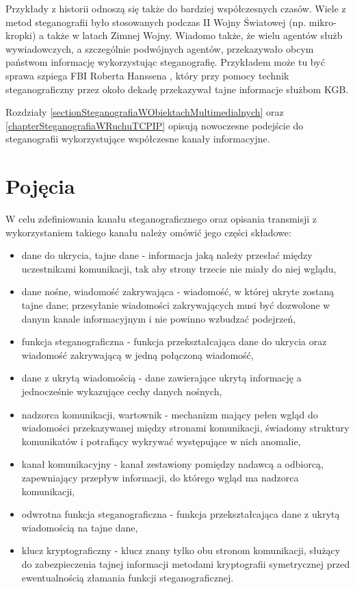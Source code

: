 \documentclass[a4paper,12pt,twoside,openany]{report}
\begin{document}
Przykłady z historii odnoszą się także do bardziej współczesnych czasów. Wiele z 
metod steganografii było stosowanych podczas II Wojny Światowej (np. 
mikro-kropki) a także w latach Zimnej Wojny. Wiadomo także, że wielu agentów 
służb wywiadowczych, a szczególnie podwójnych agentów, przekazywało obcym 
państwom informację wykorzystując steganografię. Przykładem może tu być sprawa 
szpiega FBI Roberta Hanssena \cite{Hanssen}, który przy pomocy technik 
steganograficzny przez około dekadę przekazywał tajne informacje służbom KGB.

Rozdziały \ref{sectionSteganografiaWObiektachMultimedialnych} oraz 
\ref{chapterSteganografiaWRuchuTCPIP} opisują nowoczesne podejście do 
steganografii wykorzystujące współczesne kanały informacyjne. 
\section{Pojęcia}
W celu zdefiniowania kanału steganograficznego oraz opisania transmisji z 
wykorzystaniem takiego kanału należy omówić jego części składowe:
\begin{itemize}
	\item dane do ukrycia, tajne dane - informacja jaką należy przesłać 
między uczestnikami komunikacji, tak aby strony trzecie nie miały do niej 
wglądu,
	\item dane nośne, wiadomość zakrywająca - wiadomość, w której ukryte 
zostaną tajne dane; przesyłanie wiadomości zakrywających musi być dozwolone w 
danym kanale informacyjnym i nie powinno wzbudzać podejrzeń,
	\item funkcja steganograficzna - funkcja przekształcająca dane do 
ukrycia oraz wiadomość zakrywającą w jedną połączoną wiadomość,
	\item dane z ukrytą wiadomością - dane zawierające ukrytą informację a 
jednocześnie wykazujące cechy danych nośnych,
	\item nadzorca komunikacji, wartownik - mechanizm mający pełen wgląd do 
wiadomości przekazywanej między stronami komunikacji, świadomy struktury 
komunikatów i potrafiący wykrywać występujące w nich anomalie,
	\item kanał komunikacyjny - kanał zestawiony pomiędzy nadawcą a 
odbiorcą, zapewniający przepływ informacji, do którego wgląd ma nadzorca 
komunikacji,
	\item odwrotna funkcja steganograficzna - funkcja przekształcająca dane 
z ukrytą wiadomością na tajne dane,
	\item klucz kryptograficzny - klucz znany tylko obu stronom komunikacji, 
służący do zabezpieczenia tajnej informacji metodami kryptografii symetrycznej 
przed ewentualnością złamania funkcji steganograficznej.
\end{itemize}
\end{document}
